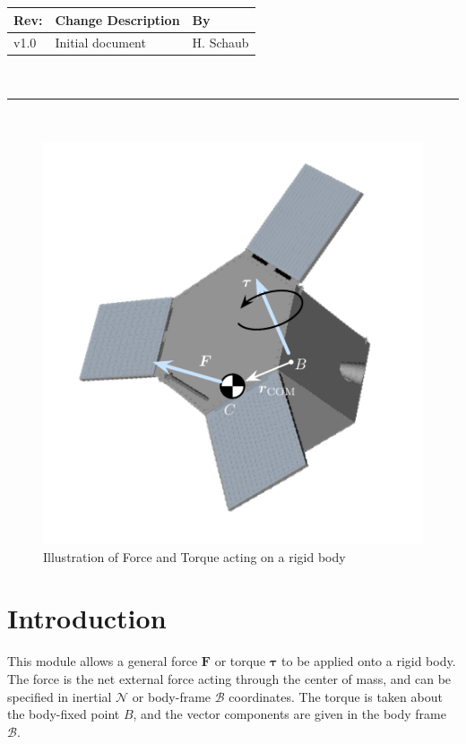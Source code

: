 \documentclass[]{BasiliskReportMemo}
\begin{document}
\makeCover


%
%
\pagestyle{empty}
{\renewcommand{\arraystretch}{1.1}
\noindent
\begin{longtable}{|p{0.5in}|p{4.5in}|p{1.14in}|}
\hline
{\bfseries Rev}: & {\bfseries Change Description} & {\bfseries By} \\
\hline
v1.0 & Initial document & H. Schaub \\
\hline

\end{longtable}
}

\newpage
\setcounter{page}{1}
\pagestyle{fancy}

\tableofcontents
~\\ \hrule ~\\


\begin{figure}[htb]
	\centerline{
	\includegraphics[]{Figures/ForceTorqueDiagram}
	}
	\caption{Illustration of Force and Torque acting on a rigid body}
	\label{fig:forceTorque}
\end{figure}
\section{Introduction}
This module allows a general force $\bm F$ or torque $\bm \tau$ to be applied onto a rigid body.  The force is the net external force acting through the center of mass, and can be specified in inertial $\mathcal{N}$ or body-frame $\mathcal{B}$ coordinates.  The torque is taken about the body-fixed point $B$, and the vector components are given in the body frame $\mathcal{B}$.
\end{document}
